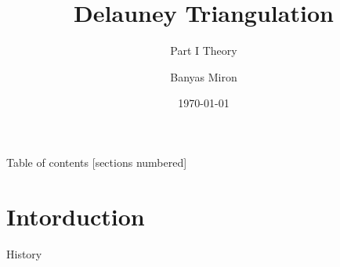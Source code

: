 \documentclass[10pt]{beamer}
\title{Delauney Triangulation}
\subtitle{Part I Theory}
\date{\today}
\author{Banyas Miron}
\institute{Kyiv Algorithms Club}
\begin{document}
\maketitle

\begin{frame}{Table of contents}
  [sections numbered]
  \tableofcontents[hideallsubsections]
\end{frame}

\section{Intorduction}

\begin{frame}{History}
\begin{figure}[h]
		\begin{minipage}[h]{0.49\linewidth}
		\end{minipage}
		\hfill
		\begin{minipage}[h]{0.49\linewidth}

\end{minipage}
\end{figure}
\end{frame}
\end{document}
